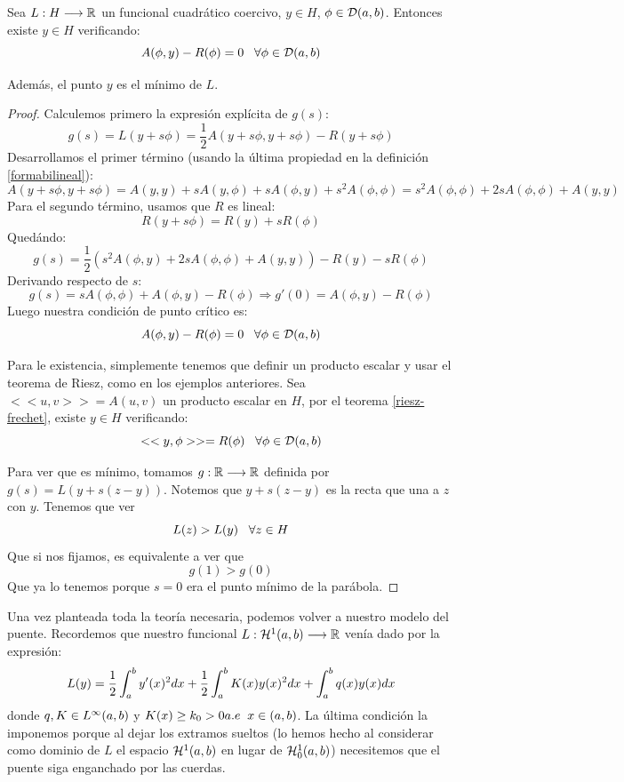 \begin{prop}
\label{puntocritico}
Sea $L : H \longrightarrow \mathbb{R}$ un funcional cuadrático coercivo, $y\in H$, $\phi\in\mathcal{D}(a,b)$. Entonces existe $y\in H$ verificando:
\[
A(\phi,y)-R(\phi)=0 \;\;\; \forall\phi\in\mathcal{D}(a,b)
\]

Además, el punto $y$ es el mínimo de $L$.
\end{prop}
\begin{proof}
Calculemos primero la expresión explícita de $g(s)$:
\[
g(s)=L(y+s\phi)=\frac{1}{2}A(y+s\phi,y+s\phi)-R(y+s\phi)
\]
Desarrollamos el primer término (usando la última propiedad en la definición \ref{formabilineal}):
\[
A(y+s\phi,y+s\phi)=A(y,y)+sA(y,\phi)+sA(\phi,y)+s^2A(\phi,\phi)=s^2A(\phi,\phi)+2sA(\phi,\phi)+A(y,y)
\]
Para el segundo término, usamos que $R$ es lineal:
\[
R(y+s\phi)=R(y)+sR(\phi)
\]
Quedándo:
\[
g(s)=\frac{1}{2}\left(s^2A(\phi,y)+2sA(\phi,\phi)+A(y,y)\right)-R(y)-sR(\phi)
\]
Derivando respecto de $s$:
\[
g(s)=sA(\phi,\phi)+A(\phi,y)-R(\phi) \Rightarrow g'(0)=A(\phi,y)-R(\phi)
\]
Luego nuestra condición de punto crítico es:
\[
A(\phi,y)-R(\phi)=0 \;\;\; \forall\phi\in\mathcal{D}(a,b)
\]

Para le existencia, simplemente tenemos que definir un producto escalar y usar el teorema de Riesz, como en los ejemplos anteriores. Sea $<<u,v>>=A(u,v)$ un producto escalar en $H$, por el teorema \ref{riesz-frechet}, existe $y\in H$ verificando:
\[
<<y,\phi>>=R(\phi) \;\;\; \forall \phi\in\mathcal{D}(a,b)
\]

Para ver que es mínimo, tomamos $g : \mathbb{R} \longrightarrow \mathbb{R}$ definida por $g(s)=L(y+s(z-y))$. Notemos que $y+s(z-y)$ es la recta que una a $z$ con $y$. Tenemos que ver
\[
L(z)>L(y) \;\;\; \forall z\in H
\]
Que si nos fijamos, es equivalente a ver que
\[
g(1)>g(0)
\]
Que ya lo tenemos porque $s=0$ era el punto mínimo de la parábola.
\end{proof}

Una vez planteada toda la teoría necesaria, podemos volver a nuestro modelo del puente. Recordemos que nuestro funcional  $L : \mathcal{H}^{ 1 } (a,b) \longrightarrow \mathbb{R}$ venía dado por la expresión:
\[
L(y)=\frac{1}{2}\displaystyle\int_{ a }^{ b } y'(x)^2dx+\frac{1}{2}\displaystyle\int_{ a }^{ b } K(x)y(x)^2dx+\displaystyle\int_{ a }^{ b } q(x)y(x)dx
\]
donde $q,K\in L^{ \infty }(a,b)$ y $K(x)\geq k_0 >0a.e \;\; x\in(a,b)$. La última condición la imponemos porque al dejar los extramos sueltos (lo hemos hecho al considerar como dominio de $L$ el espacio $\mathcal{H}^{ 1 } (a,b)$ en lugar de $\mathcal{H}_0^{ 1 } (a,b)$) necesitemos que el puente siga enganchado por las cuerdas.

